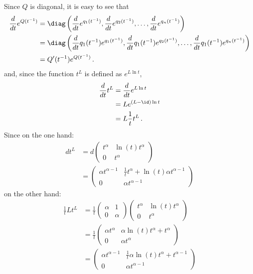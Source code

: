 \begin{rem}
  Since $Q$ is diagonal, it is easy to see that
  \begin{align*}
    \frac{d}{dt}e^{Q(t^{-1})}
    &=\diag\left(\frac{d}{dt}e^{q_1(t^{-1})},\frac{d}{dt}e^{q_2(t^{-1})}
      ,\dots,
      \frac{d}{dt}e^{q_n(t^{-1})}\right)
      \\&=\diag\left(\frac{d}{dt}q_1(t^{-1})e^{q_1(t^{-1})}
                    ,\frac{d}{dt}q_1(t^{-1})e^{q_2(t^{-1})}
                    ,\dots
                    ,\frac{d}{dt}q_1(t^{-1})e^{q_n(t^{-1})}\right)
  \\&=Q'(t^{-1})e^{Q(t^{-1})} \,.
  \end{align*}
  and, since the function $t^L$ is defined as $e^{L\ln t}$,
  \begin{align*}
    \frac{d}{dt}t^L&=\frac{d}{dt}e^{L\ln t}
    \\&=Le^{(L-\id)\ln t}
    \\&=L\frac{1}{t}t^L \,.
  \end{align*}
  Since on the one hand:
  \begin{align*}
    dt^L
    &= d\begin{pmatrix}
      t^\alpha & \ln(t)t^\alpha \\ 0 & t^\alpha
    \end{pmatrix}
    \\&=
    \begin{pmatrix}
      \alpha t^{\alpha-1} & \frac{1}{t}t^\alpha+\ln(t)\alpha t^{\alpha-1}
      \\ 0 & \alpha t^{\alpha-1}
    \end{pmatrix}
  \end{align*}
  on the other hand:
  \begin{align*}
    \frac{1}{t}Lt^L
    &= \frac{1}{t}
    \begin{pmatrix}
      \alpha & 1 \\ 0 & \alpha
    \end{pmatrix}
    \begin{pmatrix}
      t^\alpha & \ln(t)t^\alpha \\ 0 & t^\alpha
    \end{pmatrix}
    \\&= \frac{1}{t}
    \begin{pmatrix}
      \alpha t^\alpha & \alpha\ln(t)t^\alpha + t^\alpha
      \\ 0 & \alpha t^\alpha
    \end{pmatrix}
    \\&= 
    \begin{pmatrix}
      \alpha t^{\alpha-1} & \frac{1}{t}\alpha\ln(t)t^\alpha+t^{\alpha-1}
      \\ 0 & \alpha t^{\alpha-1}
    \end{pmatrix}
  \end{align*}
\end{rem}
